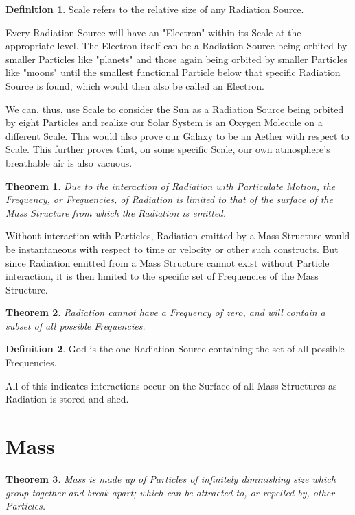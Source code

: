 \documentclass[12pt]{article}
\theoremstyle{plain}
\newtheorem{theorem}{Theorem}
\theoremstyle{definition}
\newtheorem{definition}{Definition}
\begin{document}
\begin{definition}
Scale refers to the relative size of any Radiation Source.
\end{definition}

Every Radiation Source will have an "Electron" within its Scale at the appropriate level. The Electron itself can be a Radiation Source being orbited by smaller Particles like "planets" and those again being orbited by smaller Particles like "moons" until the smallest functional Particle below that specific Radiation Source is found, which would then also be called an Electron.

We can, thus, use Scale to consider the Sun as a Radiation Source being orbited by eight Particles and realize our Solar System is an Oxygen Molecule on a different Scale. This would also prove our Galaxy to be an Aether with respect to Scale. This further proves that, on some specific Scale, our own atmosphere's breathable air is also vacuous.

\begin{theorem}
Due to the interaction of Radiation with Particulate Motion, the Frequency, or Frequencies, of Radiation is limited to that of the surface of the Mass Structure from which the Radiation is emitted.
\end{theorem}

Without interaction with Particles, Radiation emitted by a Mass Structure would be instantaneous with respect to time or velocity or other such constructs. But since Radiation emitted from a Mass Structure cannot exist without Particle interaction, it is then limited to the specific set of Frequencies of the Mass Structure.

\begin{theorem}
Radiation cannot have a Frequency of zero, and will contain a subset of all possible Frequencies.
\end{theorem}

\begin{definition}
God is the one Radiation Source containing the set of all possible Frequencies.
\end{definition}

All of this indicates interactions occur on the Surface of all Mass Structures as Radiation is stored and shed.

\section*{Mass}

\begin{theorem}
Mass is made up of Particles of infinitely diminishing size which group together and break apart; which can be attracted to, or repelled by, other Particles.
\end{theorem}
\end{document}
